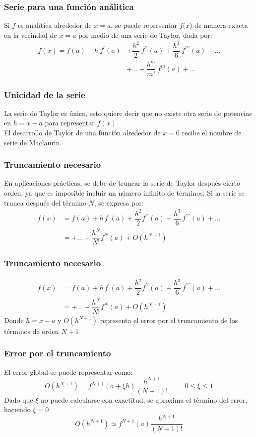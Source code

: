 \begin{frame}
\frametitle{Serie para una función análitica}
Si $f$ es analítica alrededor de $x = a$, se puede representar $f(x$) de manera exacta en la
vecindad de $x = a$ por medio de una serie de Taylor, dada por:
\begin{align*}
f(x) = f(a) + h \: f^{\prime}(a) &+ \dfrac{h^{2}}{2} \: f^{\prime \prime}(a) + \dfrac{h^{3}}{6} \: f^{\prime \prime \prime}(a) + \ldots \\
&+ \ldots + \dfrac{h^{m}}{m!} \: f^{m}(a) + \ldots
\end{align*}
\end{frame}
\begin{frame}
\frametitle{Unicidad de la serie}
La serie de Taylor es única, esto quiere decir que no existe otra serie de potencias en $h = x-a$ para representar $f(x)$
\\
\bigskip
El desarrollo de Taylor de una función alrededor de $x = 0$ recibe el nombre de serie de Maclaurin.
\end{frame}
\begin{frame}
\frametitle{Truncamiento necesario}
En aplicaciones prácticas, se debe de truncar la serie de Taylor después cierto orden, ya que es imposible incluir un número infinito de términos. Si la serie se trunca después del término $N$, se expresa por:
\begin{align*}
f(x) &= f(a) + h \, f^{\prime}(a) + \dfrac{h^{2}}{2} f^{\prime \prime}(a) + \dfrac{h^{3}}{6} \,f^{\prime \prime \prime}(a) + \ldots \\
&= + \ldots + \dfrac{h^{N}}{N!} f^{N}(a) + O(h^{N+1}) 
\end{align*}
\end{frame}
\begin{frame}
\frametitle{Truncamiento necesario}
\begin{align*}
f(x) &= f(a) + h \, f^{\prime}(a) + \dfrac{h^{2}}{2} f^{\prime \prime}(a) + \dfrac{h^{3}}{6} \,f^{\prime \prime \prime}(a) + \ldots \\
&= + \ldots + \dfrac{h^{N}}{N!} f^{N}(a) + O(h^{N+1}) 
\end{align*}
Donde $h=x-a$ y $O(h^{N+1})$ representa el error por el truncamiento de los términos de orden $N+1$
\end{frame}
\begin{frame}
\frametitle{Error por el truncamiento}
El error global se puede representar como:
\[O(h^{N+1}) = f^{N+1}(a + \xi h) \dfrac{h^{N+1}}{(N+1)!} \hspace{1cm} 0 \leq \xi \leq 1\]
Dado que $\xi$ no puede calcularse con exactitud, se aproxima el término del error, haciendo $\xi = 0$
\[ O(h^{N+1}) \simeq f^{N+1}(a) \dfrac{h^{N+1}}{(N+1)!}\]
\end{frame}
